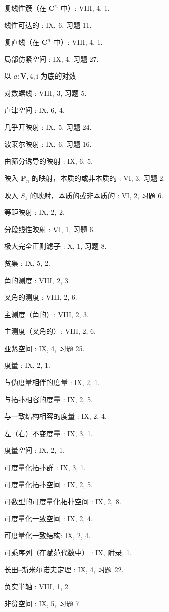 复线性簇（在 \(\mathbf{C}^n\) 中）: VIII, 4, 1.

线性可达的 : IX, 6, 习题 11.

复直线（在 \(\mathbf{C}^n\) 中）: VIII, 4, 1.

局部仿紧空间 : IX, 4, 习题 27.

以 \(a:\mathbf{V},4,\mathrm{i}\) 为底的对数

对数螺线 : VIII, 3, 习题 5.

卢津空间 : IX, 6, 4.

几乎开映射 : IX, 5, 习题 24.

波莱尔映射 : IX, 6, 习题 16.

由筛分诱导的映射 : IX, 6, 5.

映入 \(\mathbf{P}_n\) 的映射，本质的或非本质的 : VI, 3, 习题 2.

映入 \(S_{1}\) 的映射，本质的或非本质的 : VI, 2, 习题 6.

等距映射 : IX, 2, 2.

分段线性映射 : VI, 1, 习题 6.

极大完全正则滤子 : X, 1, 习题 8.

贫集 : IX, 5, 2.

角的测度 : VIII, 2, 3.

叉角的测度 : VIII, 2, 6.

主测度（角的）: VIII, 2, 3.

主测度（叉角的）: VIII, 2, 6.

亚紧空间 : IX, 4, 习题 25.

度量 : IX, 2, 1.

与伪度量相伴的度量 : IX, 2, 1.

与拓扑相容的度量 : IX, 2, 5.

与一致结构相容的度量 : IX, 2, 4.

左（右）不变度量 : IX, 3, 1.

度量空间 : IX, 2, 1.

可度量化拓扑群 : IX, 3, 1.

可度量化拓扑空间 : IX, 2, 5.

可数型的可度量化拓扑空间 : IX, 2, 8.

可度量化一致空间 : IX, 2, 4.

可度量化一致结构: IX, 2, 4.

可乘序列（在赋范代数中） : IX, 附录, 1.

长田–斯米尔诺夫定理 : IX, 4, 习题 22.

负实半轴 : VIII, 1, 2.

非贫空间 : IX, 5, 习题 7.

